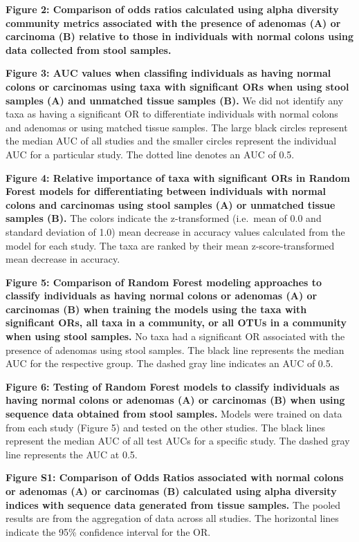 \documentclass[12pt,]{article}
\begin{document}
\textbf{Figure 2: Comparison of odds ratios calculated using alpha
diversity community metrics associated with the presence of adenomas (A)
or carcinoma (B) relative to those in individuals with normal colons
using data collected from stool samples.}

\textbf{Figure 3: AUC values when classifing individuals as having
normal colons or carcinomas using taxa with significant ORs when using
stool samples (A) and unmatched tissue samples (B).} We did not identify
any taxa as having a significant OR to differentiate individuals with
normal colons and adenomas or using matched tissue samples. The large
black circles represent the median AUC of all studies and the smaller
circles represent the individual AUC for a particular study. The dotted
line denotes an AUC of 0.5.

\textbf{Figure 4: Relative importance of taxa with significant ORs in
Random Forest models for differentiating between individuals with normal
colons and carcinomas using stool samples (A) or unmatched tissue
samples (B).} The colors indicate the z-transformed (i.e.~mean of 0.0
and standard deviation of 1.0) mean decrease in accuracy values
calculated from the model for each study. The taxa are ranked by their
mean z-score-transformed mean decrease in accuracy.

\textbf{Figure 5: Comparison of Random Forest modeling approaches to
classify individuals as having normal colons or adenomas (A) or
carcinomas (B) when training the models using the taxa with significant
ORs, all taxa in a community, or all OTUs in a community when using
stool samples.} No taxa had a significant OR associated with the
presence of adenomas using stool samples. The black line represents the
median AUC for the respective group. The dashed gray line indicates an
AUC of 0.5.

\textbf{Figure 6: Testing of Random Forest models to classify
individuals as having normal colons or adenomas (A) or carcinomas (B)
when using sequence data obtained from stool samples.} Models were
trained on data from each study (Figure 5) and tested on the other
studies. The black lines represent the median AUC of all test AUCs for a
specific study. The dashed gray line represents the AUC at 0.5.

\newpage

\textbf{Figure S1: Comparison of Odds Ratios associated with normal
colons or adenomas (A) or carcinomas (B) calculated using alpha
diversity indices with sequence data generated from tissue samples.} The
pooled results are from the aggregation of data across all studies. The
horizontal lines indicate the 95\% confidence interval for the OR.
\end{document}
